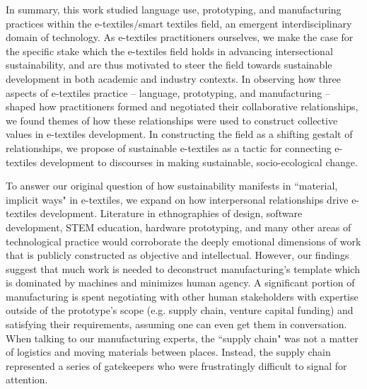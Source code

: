 In summary, this work studied language use, prototyping, and manufacturing practices within the e-textiles/smart textiles field, an emergent interdisciplinary domain of technology. As e-textiles practitioners ourselves, we make the case for the specific stake which the e-textiles field holds in advancing intersectional sustainability, and are thus motivated to steer the field towards sustainable development in both academic and industry contexts. In observing how three aspects of e-textiles practice -- language, prototyping, and manufacturing -- shaped how practitioners formed and negotiated their collaborative relationships, we 
found themes of how these relationships were used to construct collective values in e-textiles development. In constructing the field as a shifting gestalt of relationships, we propose  of sustainable e-textiles as a tactic for connecting e-textiles development to discourses in making sustainable, socio-ecological change.

To answer our original question of how sustainability manifests in ``material, implicit ways" in e-textiles, we expand on how interpersonal relationships drive e-textiles development. Literature in ethnographies of design, software development, STEM education, hardware prototyping, and many other areas of technological practice would corroborate the deeply emotional dimensions of work that is publicly constructed as objective and intellectual. However, our findings suggest that much work is needed to deconstruct manufacturing's template which is dominated by machines and minimizes human agency. 
A significant portion of manufacturing is spent negotiating with other human stakeholders with expertise outside of the prototype's scope (e.g. supply chain, venture capital funding) and satisfying their requirements, assuming one can even get them in conversation. When talking to our manufacturing experts, the ``supply chain" was not a matter of logistics and moving materials between places. Instead, the supply chain represented a series of gatekeepers who were frustratingly difficult to signal for attention. 

